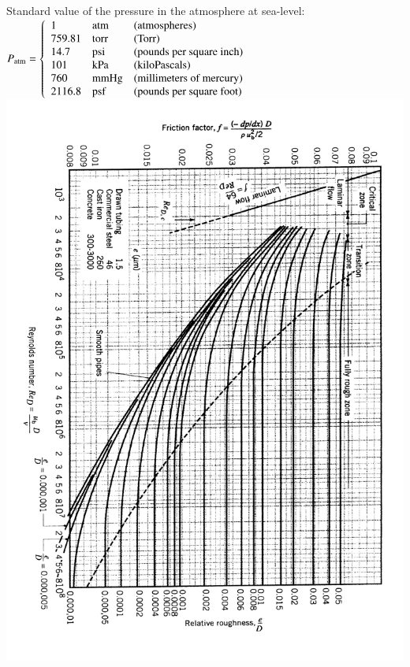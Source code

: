 \documentclass[oneside,onecolumn,a4paper,10pt,notitlepage]{tables}
\newcommand{\mfd}{\displaystyle}
\begin{document}
\vfill
Standard value of the pressure in the atmosphere at sea-level:\\
$
\mfd
P_{\rm atm}=\left\{ 
\begin{array}{lll}
1 & {\rm atm} & \textrm{(atmospheres)}\\
759.81 & {\rm torr} & \textrm{(Torr)}\\
14.7 & {\rm psi} & \textrm{(pounds per square inch)}\\
101 & {\rm kPa} & \textrm{(kiloPascals)}\\
760 & {\rm mmHg} & \textrm{(millimeters of mercury)}\\
2116.8 & {\rm psf} & \textrm{(pounds per square foot)}
\end{array}
 \right.
$
\vfill\vfill\vfill
\vfill\vfill\vfill
\vfill\vfill\vfill
\vfill\vfill\vfill
\vfill\vfill\vfill
~\\
\newpage
\includegraphics[width=\textwidth]{moody.pdf}
\end{document}
